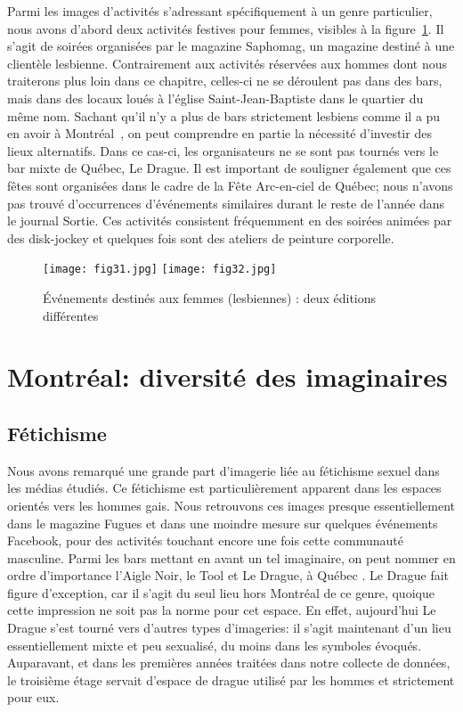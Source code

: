 Parmi les images d'activités s'adressant spécifiquement à un genre particulier, nous avons d'abord deux activités festives pour femmes, visibles à la figure~\ref{figs3132}.
Il s'agit de soirées organisées par le magazine Saphomag, un magazine destiné à une clientèle lesbienne.
Contrairement aux activités réservées aux hommes dont nous traiterons plus loin dans ce chapitre, celles-ci ne se déroulent pas dans des bars, mais dans des locaux loués à l'église Saint-Jean-Baptiste dans le quartier du même nom.
Sachant qu'il n'y a plus de bars strictement lesbiens comme il a pu en avoir à Montréal~\citep{Podmore2006}, on peut comprendre en partie la nécessité d'investir des lieux alternatifs.
Dans ce cas-ci, les organisateurs ne se sont pas tournés vers le bar mixte de Québec, Le Drague.
Il est important de souligner également que ces fêtes sont organisées dans le cadre de la Fête Arc-en-ciel de Québec; nous n'avons pas trouvé d'occurrences d'événements similaires durant le reste de l'année dans le journal Sortie.
Ces activités consistent fréquemment en des soirées animées par des disk-jockey et quelques fois sont des ateliers de peinture corporelle.

\begin{figure}
\centering
{}
{\texttt{[image: fig31.jpg]}}
{\texttt{[image: fig32.jpg]}}
\caption{Événements destinés aux femmes (lesbiennes) : deux éditions
  différentes}\label{figs3132}
\end{figure}

\section{Montréal: diversité des imaginaires}
\label{sec:montr_al_diversit_des_imaginaires}

\subsection{Fétichisme}
Nous avons remarqué une grande part d'imagerie liée au fétichisme sexuel dans les médias étudiés.
Ce fétichisme est particulièrement apparent dans les espaces orientés vers les hommes gais.
Nous retrouvons ces images presque essentiellement dans le magazine Fugues et dans une moindre mesure sur quelques événements Facebook, pour des activités touchant encore une fois cette communauté masculine.
Parmi les bars mettant en avant un tel imaginaire, on peut nommer en ordre d'importance l'Aigle Noir, le Tool et Le Drague, à Québec .
Le Drague fait figure d'exception, car il s'agit du seul lieu hors Montréal de ce genre, quoique cette impression ne soit pas la norme pour cet espace.
En effet, aujourd'hui Le Drague s'est tourné vers d'autres types d'imageries: il s'agit maintenant d'un lieu essentiellement mixte et peu sexualisé, du moins dans les symboles évoqués.
Auparavant, et dans les premières années traitées dans notre collecte de données, le troisième étage servait d'espace de drague utilisé par les hommes et strictement pour eux.


